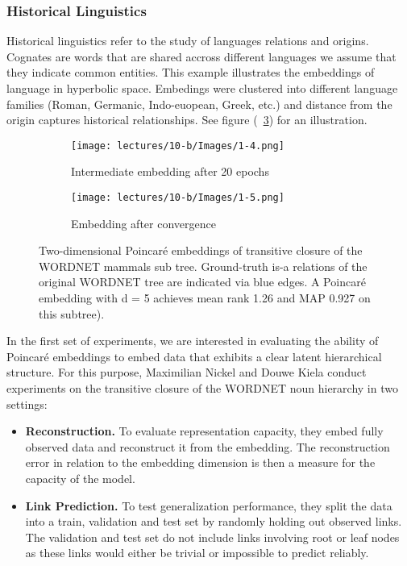 \subsubsection{Historical Linguistics}
Historical linguistics refer to the study of languages relations and origins. Cognates are words that are shared accross different languages we assume that they indicate common entities. This example illustrates the embeddings of language in hyperbolic space. Embedings were clustered into different language families (Roman, Germanic, Indo-euopean, Greek, etc.) and distance from the origin captures historical relationships. See figure  (~\ref{fig:liguistics}) for an illustration.
\begin{figure}[htb]
    \centering
    \begin{adjustbox}{minipage=\linewidth,scale=0.7}
    \begin{subfigure}[b]{\columnwidth}
        \texttt{[image: lectures/10-b/Images/1-4.png]}
            \caption{Intermediate embedding after 20 epochs}
            \label{fig:linguistics1}
        \vspace{0.7cm}
        \end{subfigure}
        \begin{subfigure}[b]{\columnwidth}
            \texttt{[image: lectures/10-b/Images/1-5.png]}
            \caption{Embedding after convergence}       
            \label{fig:linguistics2}
        \end{subfigure}
    \end{adjustbox}
    \caption{Two-dimensional Poincaré embeddings of transitive closure of the WORDNET mammals sub tree. Ground-truth is-a relations of the original WORDNET tree are indicated via blue edges. A Poincaré embedding with d = 5 achieves mean rank 1.26 and MAP 0.927 on this subtree).}\label{fig:liguistics}
    
    
\end{figure}

In the first set of experiments, we are interested in evaluating the ability of Poincaré embeddings to embed data that exhibits a clear latent hierarchical structure. For this purpose, Maximilian Nickel and Douwe Kiela \cite{NIPS2017_7213} conduct experiments on the transitive closure of the WORDNET noun hierarchy in two settings:
\begin{itemize}

    \item \textbf{Reconstruction.} To evaluate representation capacity, they embed fully observed data and reconstruct it from the embedding. The reconstruction error in relation to the embedding dimension is then a measure for the capacity of the model.
    \item \textbf{Link Prediction.} To test generalization performance, they split the data into a train, validation and test set by randomly holding out observed links. The validation and test set do not include links involving root or leaf nodes as these links would either be trivial or impossible to predict reliably.
\end{itemize}

